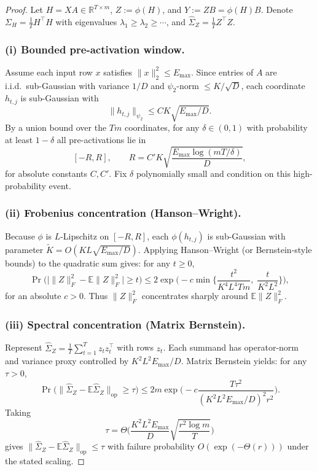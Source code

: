 \documentclass[sigconf,screen]{acmart}
\begin{document}
\begin{proof}
Let \(H=XA\in\mathbb R^{T\times m}\), \(Z:=\phi(H)\), and \(Y:=ZB=\phi(H)B\). Denote \(\Sigma_H=\tfrac{1}{T}H^\top H\) with eigenvalues \(\lambda_1\ge\lambda_2\ge\cdots\), and \(\widehat\Sigma_Z=\tfrac{1}{T}Z^\top Z\).

\subsubsection*{\bf (i) Bounded pre-activation window.}  
Assume each input row \(x\) satisfies \(\|x\|_2^2\le E_{\max}\). Since entries of \(A\) are i.i.d.\ sub-Gaussian with variance \(1/D\) and \(\psi_2\)-norm \(\le K/\sqrt D\), each coordinate \(h_{t,j}\) is sub-Gaussian with
\[
\|h_{t,j}\|_{\psi_2}\le C K\sqrt{E_{\max}/D}.
\]
By a union bound over the \(T m\) coordinates, for any \(\delta\in(0,1)\) with probability at least \(1-\delta\) all pre-activations lie in
\[
[-R,R],\qquad R=C'K\sqrt{\frac{E_{\max}\log(mT/\delta)}{D}},
\]
for absolute constants \(C,C'\). Fix \(\delta\) polynomially small and condition on this high-probability event.

\subsubsection*{\bf (ii) Frobenius concentration (Hanson–Wright).}  
Because \(\phi\) is \(L\)-Lipschitz on \([-R,R]\), each \(\phi(h_{t,j})\) is sub-Gaussian with parameter \(\tilde K=O(KL\sqrt{E_{\max}/D})\). Applying Hanson–Wright (or Bernstein-style bounds) to the quadratic sum gives: for any \(t\ge0\),
\[
\Pr\!\big(\big|\|Z\|_F^2-\mathbb E\|Z\|_F^2\big|\ge t\big)
\le 2\exp\!\Big(-c\min\Big\{\frac{t^2}{K^4L^4Tm},\;\frac{t}{K^2L^2}\Big\}\Big),
\]
for an absolute \(c>0\). Thus \(\|Z\|_F^2\) concentrates sharply around \(\mathbb E\|Z\|_F^2\).

\subsubsection*{\bf (iii) Spectral concentration (Matrix Bernstein).}  
Represent \(\widehat\Sigma_Z=\tfrac{1}{T}\sum_{t=1}^T z_t z_t^\top\) with rows \(z_t\). Each summand has operator-norm and variance proxy controlled by \(K^2L^2E_{\max}/D\). Matrix Bernstein yields: for any \(\tau>0\),
\[
\Pr\big(\|\widehat\Sigma_Z-\mathbb E\widehat\Sigma_Z\|_{\mathrm{op}}\ge\tau\big)
\le 2m\exp\!\Big(-c\frac{T\tau^2}{(K^2L^2E_{\max}/D)^2 r^2}\Big).
\]
Taking
\[
\tau=\Theta\!\Big(\frac{K^2L^2E_{\max}}{D}\sqrt{\frac{r^2\log m}{T}}\Big)
\]
gives \(\|\widehat\Sigma_Z-\mathbb E\widehat\Sigma_Z\|_{\mathrm{op}}\le\tau\) with failure probability \(O(\exp(-\Theta(r)))\) under the stated scaling.


\end{proof}
\end{document}
